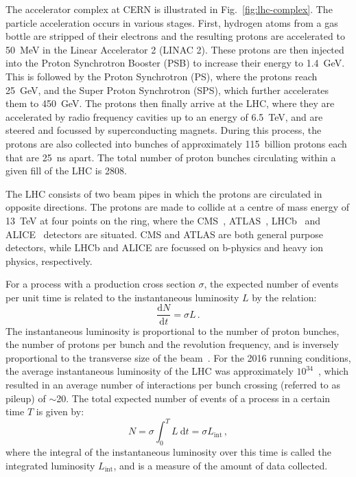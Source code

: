 The accelerator complex at CERN is illustrated in Fig.~\ref{fig:lhc-complex}. 
The particle acceleration occurs in various stages. First, hydrogen atoms from 
a gas bottle are stripped of their electrons and the resulting protons are 
accelerated to 50~MeV in the Linear Accelerator 2 (LINAC 2). These protons are 
then injected into the Proton Synchrotron Booster (PSB) to increase their 
energy to 1.4~GeV. This is followed by the Proton Synchrotron (PS), where the 
protons reach 25~GeV, and the Super Proton Synchrotron (SPS), which further 
accelerates them to 450~GeV. The protons then finally arrive at the LHC, where 
they are accelerated by radio frequency cavities up to an energy of 6.5~TeV, 
and are steered and focussed by superconducting magnets.
During this process, the protons are also collected into bunches of 
approximately 115~billion protons each that are 25~ns apart. The total number 
of proton bunches circulating within a given fill of the LHC is 2808.

The LHC consists of two beam pipes in which the protons are circulated in 
opposite directions. The protons are made to collide at a centre of mass energy 
of 13~TeV at four points on the ring, where the CMS~\cite{cms}, 
ATLAS~\cite{atlas}, LHCb~\cite{lhcb} and ALICE~\cite{alice} detectors are 
situated. CMS and ATLAS are both general purpose detectors, while LHCb and 
ALICE are focussed on b-physics and heavy ion physics, respectively.

For a process with a production cross section $\sigma$, the expected number of 
events per unit time is related to the instantaneous luminosity $L$ by the 
relation:
\begin{equation}
\frac{\mathrm d N}{\mathrm d t} = \sigma L \, .
\end{equation}
The instantaneous luminosity is proportional to the number of proton bunches, 
the number of protons per bunch and the revolution frequency, and is inversely 
proportional to the transverse size of the beam~\cite{pdg12}. 
For the 2016 running conditions, the average instantaneous luminosity of the 
LHC was approximately $10^{34}$~\lumiunits, which resulted in an average number 
of 
interactions per bunch crossing (referred to as pileup) of $\sim$20.
The total expected number of events of a process in a certain time $T$ is given 
by:
\begin{equation}
N = \sigma \int_{0}^{T} L ~ \mathrm d t = \sigma L_\mathrm{int} \, ,
\end{equation}
where the integral of the instantaneous luminosity over this time is called the 
integrated luminosity $L_\mathrm{int}$, and is a measure of the amount of data 
collected.

